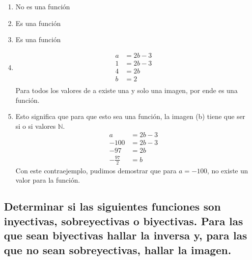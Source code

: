\documentclass[11pt]{article}
\begin{document}
\begin{enumerate}[label=\roman*)]
    \item No es una función
    \item Es una función
    \item Es una función
    \item \begin{align*}
        a &= 2 b - 3 \\
        1 &=2 b - 3 \\
        4 &= 2b \\
        b &= 2 \\
    \end{align*}
    Para todos los valores de a existe una y solo una imagen, por ende es una función.
    \item Esto significa que para que esto sea una función, la imagen (b) tiene que ser si o si valores $\mathbb{N}$. 
    \begin{align*}
        a &= 2b - 3 \\
        - 100 &= 2b - 3 \\
        - 97 &= 2b \\
       - \frac{97}{2} &= b
    \end{align*}
    Con este contraejemplo, pudimos demostrar que para $a = - 100$, no existe un valor para la función. 
\end{enumerate}

\subsection{Determinar si las siguientes funciones son inyectivas, sobreyectivas o biyectivas. Para las que sean biyectivas hallar la inversa y, para las que no sean sobreyectivas, hallar la imagen.}
\end{document}
